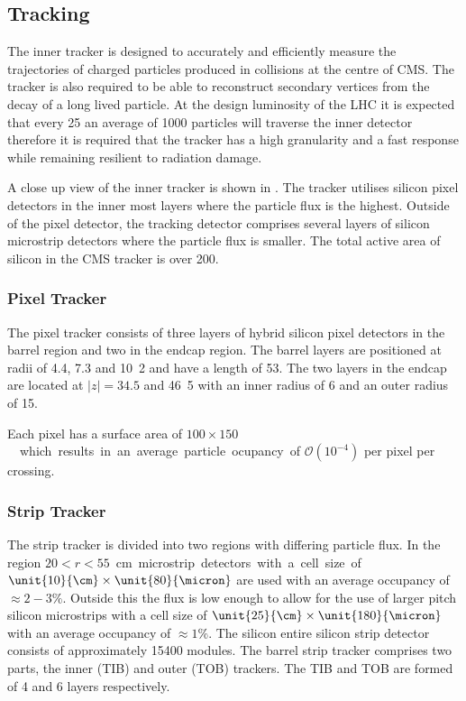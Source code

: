 \subsection{Tracking}
The inner tracker is designed to accurately and efficiently measure the
trajectories of charged particles produced in collisions at the centre of CMS.
The tracker is also required to be able to reconstruct secondary vertices from
the decay of a long lived particle.  At the design luminosity of the LHC it
is expected that every \unit{25}{\ns} an average of 1000 particles will traverse
the inner detector therefore it is required that the tracker has a high
granularity and a fast response while remaining resilient to radiation damage. 


A close up view of the inner tracker is shown in .  The
tracker utilises silicon pixel detectors in the inner most layers where the
particle flux is the highest.  Outside of the pixel detector, the tracking
detector comprises several layers of silicon microstrip detectors where the
particle flux is smaller.  The total active area of silicon in the CMS tracker
is over \unit{200}{\meter\squared}.\cite{cms}

\subsubsection{Pixel Tracker}
The pixel tracker consists of three layers of hybrid silicon pixel detectors in
the barrel region and two in the endcap region. 
The barrel layers are positioned at radii of 4.4, 7.3 and \unit{10.2}{\cm} and have
a length of \unit{53}{\cm}. The two layers in the endcap are located at
$|z|=34.5$ and \unit{46.5}{\cm} with an inner radius of \unit{6}{\cm} and an
outer radius of \unit{15}{\cm}.

Each pixel has a surface area of \unit{$100\times150$}{\micron} which results in
an average particle ocupancy of $\mathcal{O}(10^{-4})$ per pixel per crossing.

\subsubsection{Strip Tracker}
The strip tracker is divided into two regions with differing particle flux. In
the region \unit{$20<r<55$}{cm} microstrip detectors with a cell size of
$\unit{10}{\cm}\times\unit{80}{\micron}$ are used with an average occupancy of
$\approx\unit{2-3}{\%}$.
Outside this the flux is low enough to allow for the use of larger pitch silicon
microstrips with a cell size of $\unit{25}{\cm}\times\unit{180}{\micron}$ with
an average occupancy of $\approx\unit{1}{\%}$.
The silicon entire silicon strip detector consists of approximately 15400
modules. 
The barrel strip tracker comprises two parts, the inner (TIB) and outer (TOB)
trackers. The TIB and TOB are formed of 4 and 6 layers respectively.

